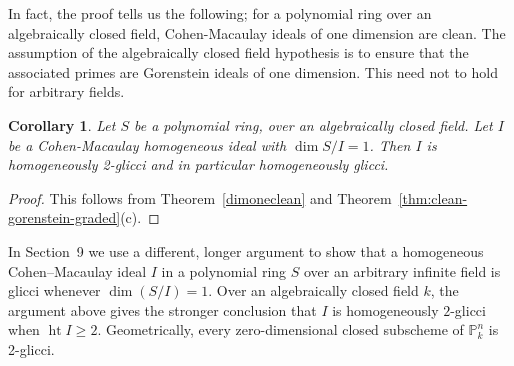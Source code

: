 \documentclass[11pt,letterpaper]{amsart}
\theoremstyle{plain}
\newtheorem{cor}[thm]{Corollary}
\theoremstyle{definition}
\theoremstyle{remark}
\begin{document}
In fact, the proof tells us the following; for a polynomial ring over an algebraically closed field, Cohen-Macaulay ideals of one dimension are clean. The assumption of the algebraically closed field hypothesis is to ensure that the associated primes are Gorenstein ideals of one dimension. This need not to hold for arbitrary fields.

\begin{cor}\label{algcloseddimone}
    Let $S$ be a polynomial ring, over an algebraically closed field. Let $I$ be a Cohen-Macaulay homogeneous ideal with $\dim S/I=1$. Then $I$ is homogeneously 2-glicci and in particular homogeneously glicci.  
\end{cor}
\begin{proof}
    This follows from Theorem~\ref{dimoneclean} and Theorem~\ref{thm:clean-gorenstein-graded}(c).
\end{proof}


In Section~9 we use a different, longer argument to show that a
homogeneous Cohen--Macaulay ideal \(I\) in a polynomial ring \(S\) over
an arbitrary infinite field is glicci whenever \(\dim(S/I)=1\). Over an
algebraically closed field \(k\), the argument above gives the stronger
conclusion that \(I\) is homogeneously \(2\)-glicci when
\(\operatorname{ht} I\ge 2\). Geometrically, every zero-dimensional
closed subscheme of \(\mathbb{P}^n_k\) is 2-glicci.
\end{document}
